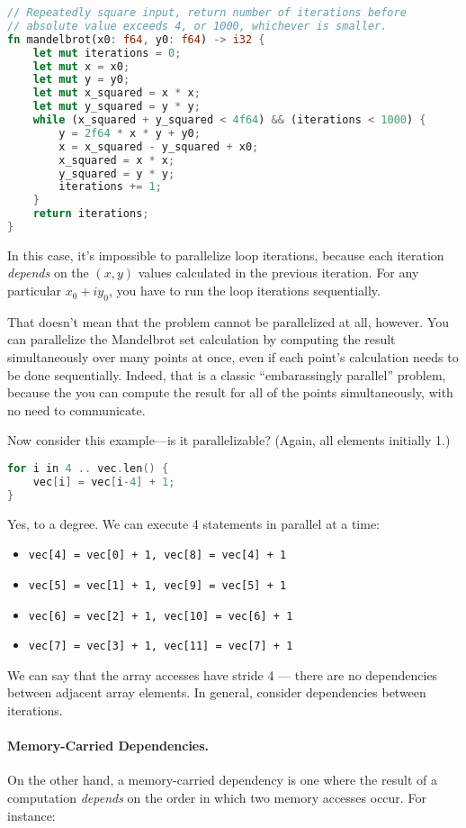 \begin{lstlisting}[language=Rust]
// Repeatedly square input, return number of iterations before
// absolute value exceeds 4, or 1000, whichever is smaller.
fn mandelbrot(x0: f64, y0: f64) -> i32 {
    let mut iterations = 0;
    let mut x = x0;
    let mut y = y0;
    let mut x_squared = x * x;
    let mut y_squared = y * y;
    while (x_squared + y_squared < 4f64) && (iterations < 1000) {
        y = 2f64 * x * y + y0;
        x = x_squared - y_squared + x0;
        x_squared = x * x;
        y_squared = y * y;
        iterations += 1;
    }
    return iterations;
}
\end{lstlisting}
In this case, it's impossible to parallelize loop iterations, because
each iteration \emph{depends} on the $(x, y)$ values calculated in the
previous iteration. For any particular $x_0 + iy_0$, you have to run the
loop iterations sequentially.

That doesn't mean that the problem cannot be parallelized at all, however.
You can parallelize the Mandelbrot set calculation
by computing the result simultaneously over many points at
once, even if each point's calculation needs to be done sequentially.
Indeed, that is a classic ``embarassingly parallel'' problem,
because the you can compute the result for all of the points
simultaneously, with no need to communicate.

 Now consider this example---is it parallelizable? (Again, all elements initially 1.)

\begin{lstlisting}[language=C]
for i in 4 .. vec.len() {
    vec[i] = vec[i-4] + 1;
}
\end{lstlisting}

Yes, to a degree. We can execute 4 statements in parallel at a time:
\begin{itemize}
  \item \texttt{vec[4] = vec[0] + 1, vec[8] = vec[4] + 1}
  \item \texttt{vec[5] = vec[1] + 1, vec[9] = vec[5] + 1}
  \item \texttt{vec[6] = vec[2] + 1, vec[10] = vec[6] + 1}
  \item \texttt{vec[7] = vec[3] + 1, vec[11] = vec[7] + 1}
\end{itemize}  
We can say that the array accesses have stride 4 --- there are no
dependencies between adjacent array elements. In general, consider
dependencies between iterations.


\paragraph{Memory-Carried Dependencies.} On the other hand, a memory-carried dependency is one where the result
of a computation \emph{depends} on the order in which two memory accesses
occur. For instance:

